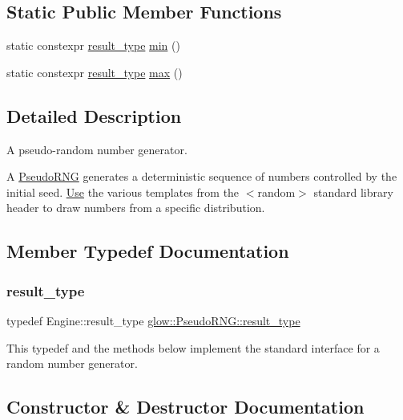 \subsection*{Static Public Member Functions}
\begin{DoxyCompactItemize}
\item 
static constexpr \hyperlink{classglow_1_1_pseudo_r_n_g_a3fe973c9dca35c5b572da3ed711df069}{result\+\_\+type} \hyperlink{classglow_1_1_pseudo_r_n_g_a3bd34021eb9345528df795dd66f3181a}{min} ()
\item 
static constexpr \hyperlink{classglow_1_1_pseudo_r_n_g_a3fe973c9dca35c5b572da3ed711df069}{result\+\_\+type} \hyperlink{classglow_1_1_pseudo_r_n_g_aa98bf022462ca4fc96382a67d1800a0d}{max} ()
\end{DoxyCompactItemize}


\subsection{Detailed Description}
A pseudo-\/random number generator.

A \hyperlink{classglow_1_1_pseudo_r_n_g}{Pseudo\+R\+NG} generates a deterministic sequence of numbers controlled by the initial seed. \hyperlink{structglow_1_1_use}{Use} the various templates from the $<$random$>$ standard library header to draw numbers from a specific distribution. 

\subsection{Member Typedef Documentation}
\mbox{\label{classglow_1_1_pseudo_r_n_g_a3fe973c9dca35c5b572da3ed711df069}} 
\subsubsection{\texorpdfstring{result\+\_\+type}{result\_type}}
{\footnotesize\ttfamily typedef Engine\+::result\+\_\+type \hyperlink{classglow_1_1_pseudo_r_n_g_a3fe973c9dca35c5b572da3ed711df069}{glow\+::\+Pseudo\+R\+N\+G\+::result\+\_\+type}}

This typedef and the methods below implement the standard interface for a random number generator. 

\subsection{Constructor \& Destructor Documentation}
\mbox{\label{classglow_1_1_pseudo_r_n_g_af2e430b238bb9d081e6771acaac0956c}} 
